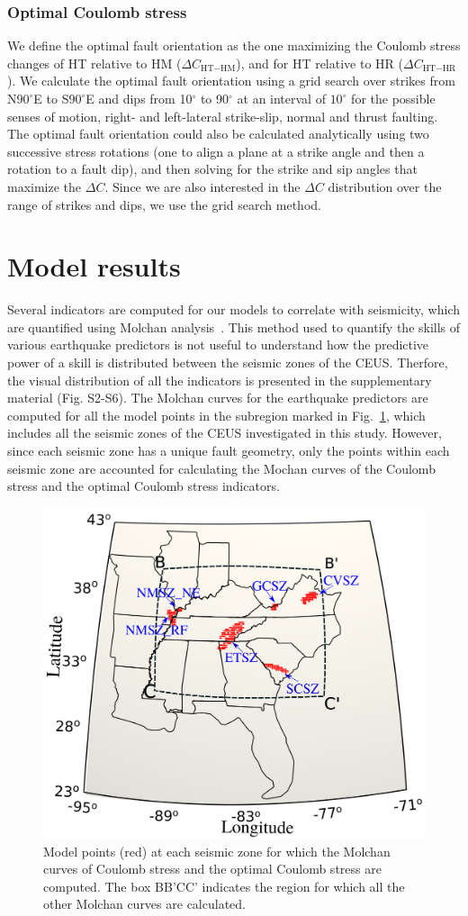 \documentclass[draft,linenumbers]{agujournal2018}
\begin{document}
\subsubsection{Optimal Coulomb stress}
We define the optimal fault orientation as the one maximizing the Coulomb stress changes of HT relative to HM ($\Delta C_{\text{HT}-\text{HM}}$), and for HT relative to HR ($\Delta C_{\text{HT}-\text{HR}}$). We calculate the optimal fault orientation using a grid search over strikes from N$90^\circ$E to S$90^\circ$E and dips from 10$^\circ$ to 90$^\circ$ at an interval of $10^\circ$ for the possible senses of motion, right- and left-lateral strike-slip, normal and thrust faulting. The optimal fault orientation could also be calculated analytically using two successive stress rotations (one to align a plane at a strike angle and then a rotation to a fault dip), and then solving for the strike and sip angles that maximize the $\Delta C$. Since we are also interested in the $\Delta C$ distribution over the range of strikes and dips, we use the grid search method.

\section{Model results}
Several indicators are computed for our models to correlate with seismicity, which are quantified using Molchan analysis~\citep{becker2015western}. This method used to quantify the skills of various earthquake predictors is not useful to understand how the predictive power of a skill is distributed between the seismic zones of the CEUS.   Therfore, the visual distribution of all the indicators is presented in the supplementary material (Fig. S2-S6). The Molchan curves for the earthquake predictors are computed for all the model points in the subregion marked in Fig.~\ref{zones}, which includes all the seismic zones of the CEUS investigated in this study. However, since each seismic zone has a unique fault geometry, only the points within each seismic zone are accounted for calculating the Mochan curves of the Coulomb stress and the optimal Coulomb stress indicators. 
%
\begin{figure}
\centering
	\includegraphics[width=0.6\linewidth]{figures/seismic_zones.png}
	\caption{Model points (red) at each seismic zone for which the Molchan curves of Coulomb stress and the optimal Coulomb stress are computed. The box BB'CC' indicates the region for which all the other Molchan curves are calculated. }
	\label{zones}
\end{figure}
\end{document}
